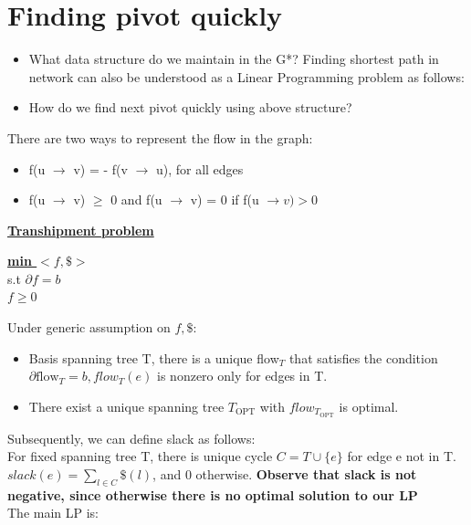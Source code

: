 \documentclass{article}
\begin{document}
\section{Finding pivot quickly}
\begin{itemize}
\item What data structure do we maintain in the G*?
Finding shortest path in network can also be understood as a Linear Programming problem as follows:

\item How do we find next pivot quickly using above structure?
\end{itemize}

There are two ways to represent the flow in the graph:
\begin{itemize}
\item f(u $\rightarrow$ v) = - f(v $\rightarrow$ u), for all edges
\item f(u $\rightarrow$ v) $\geq$ 0 and f(u $\rightarrow$ v) = 0 if f(u $\rightarrow v) > 0$
\end{itemize}

\textbf{\underline{Transhipment problem}}

\begin{center}
\begin{algorithm}
\textbf{\underline{min $<f, \$>$}} \\
  s.t  $\partial f = b$ \\ \qquad
       $f \geq 0$
\end{algorithm}
\end{center}

Under generic assumption on $f, \$$:
\begin{itemize}
\item Basis spanning tree T, there is a unique flow$_T$ that satisfies the 
condition $\partial \text{flow}_T = b, flow_T (e)$ is nonzero only for edges in T.
\item There exist a unique spanning tree $T_{\text{OPT}}$ with $flow_{T_\text{OPT}}$ 
is optimal.
\end{itemize}

Subsequently, we can define slack as follows: \\
For fixed spanning tree T, there is unique cycle $C = T \cup \{e\}$ for edge e 
not in T. $slack(e) = \sum_{l \in C} \$(l)$, and 0 otherwise.
\textbf{Observe that slack is not negative, since otherwise there is no optimal solution to our LP} \\
The main LP is:\\
\end{document}
